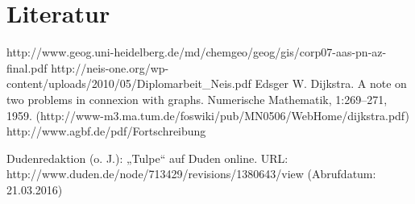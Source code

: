 \documentclass[10pt,a4paper]{article}
\begin{document}
\section{Literatur}

http://www.geog.uni-heidelberg.de/md/chemgeo/geog/gis/corp07-aas-pn-az-final.pdf
http://neis-one.org/wp-content/uploads/2010/05/Diplomarbeit_Neis.pdf
Edsger W. Dijkstra. A note on two problems in connexion with graphs. Numerische Mathematik,
1:269–271, 1959. (http://www-m3.ma.tum.de/foswiki/pub/MN0506/WebHome/dijkstra.pdf)
http://www.agbf.de/pdf/Fortschreibung%

Dudenredaktion (o. J.): „Tulpe“ auf Duden online. URL: http://www.duden.de/node/713429/revisions/1380643/view (Abrufdatum: 21.03.2016)
\end{document}
